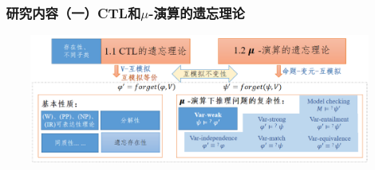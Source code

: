 \documentclass[aspectratio=1610, 9pt, CJK]{beamer}
\begin{document}
\begin{frame}  
	\frametitle{~研究内容（一）CTL和$\mu$-演算的遗忘理论}
	\begin{figure}
		\includegraphics[scale=0.45]{figures/ctlMuForgFrameh}
	\end{figure}
\end{frame}
\end{document}
